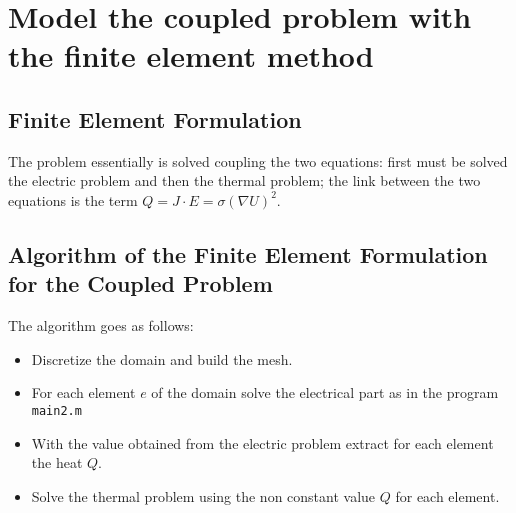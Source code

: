 \section{Model the coupled problem with the finite element method}
\subsection{Finite Element Formulation}
The problem essentially is solved coupling the two equations: first must be solved the electric problem and then the thermal problem; the link between the two equations is the term $ Q = J\cdot E=\sigma(\nabla U)^2. $ 

\subsection{Algorithm of the Finite Element Formulation for the Coupled Problem}
\begin{mdframed}
	The algorithm goes as follows:
	\begin{itemize}
		\item Discretize the domain and build the mesh.
		\item For each element $ e $ of the domain solve the electrical part as in the program \texttt{main2.m}
		\item With the value obtained from the electric problem extract for each element the heat $ Q $.
		\item Solve the thermal problem using the non constant value $ Q $ for each element.
	\end{itemize}
\end{mdframed}
